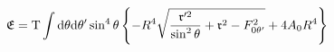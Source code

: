 \begin{equation}
\frak{E}=\mathrm{T}\int \mathrm{d}\theta \mathrm{d}\theta ^{\prime }\sin
^{4}\theta \left\{ -R^{4}\sqrt{\frac{\frak{r}^{\prime 2}}{\sin ^{2}\theta }+%
\frak{r}^{2}-F_{0\theta ^{\prime }}^{2}}+4A_{0}R^{4}\right\}  \label{energy}
\end{equation}

